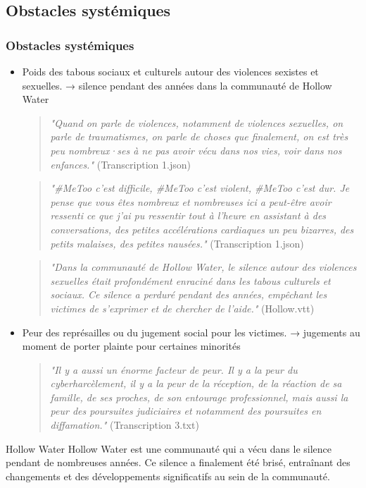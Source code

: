\documentclass[french]{beamer}
\begin{document}
\subsection{Obstacles systémiques}
\begin{frame}
	\frametitle{Obstacles systémiques}
	\begin{itemize}
		\item Poids des tabous sociaux et culturels autour des violences sexistes et sexuelles. → silence pendant des années dans la communauté de Hollow Water
			\begin{quote}
				\textit{"Quand on parle de violences, notamment de violences sexuelles, on parle de traumatismes, on parle de choses que finalement, on est très peu nombreux·ses à ne pas avoir vécu dans nos vies, voir dans nos enfances."} (Transcription 1.json)
			\end{quote}
			\begin{quote}
				\textit{"#MeToo c'est difficile, #MeToo c'est violent, #MeToo c'est dur. Je pense que vous êtes nombreux et nombreuses ici a peut-être avoir ressenti ce que j'ai pu ressentir tout à l'heure en assistant à des conversations, des petites accélérations cardiaques un peu bizarres, des petits malaises, des petites nausées."} (Transcription 1.json)
				\end{quote}
			\begin{quote}
				\textit{"Dans la communauté de Hollow Water, le silence autour des violences sexuelles était profondément enraciné dans les tabous culturels et sociaux. Ce silence a perduré pendant des années, empêchant les victimes de s'exprimer et de chercher de l'aide."} (Hollow.vtt)
			\end{quote}
		\item Peur des représailles ou du jugement social pour les victimes. → jugements au moment de porter plainte pour certaines minorités
			\begin{quote}
				\textit{"Il y a aussi un énorme facteur de peur. Il y a la peur du cyberharcèlement, il y a la peur de la réception, de la réaction de sa famille, de ses proches, de son entourage professionnel, mais aussi la peur des poursuites judiciaires et notamment des poursuites en diffamation."} (Transcription 3.txt)
			\end{quote}
	\end{itemize}
	\begin{block}{Hollow Water}
		Hollow Water est une communauté qui a vécu dans le silence pendant de nombreuses années. Ce silence a finalement été brisé, entraînant des changements et des développements significatifs au sein de la communauté.
	\end{block}
\end{frame}
\end{document}
